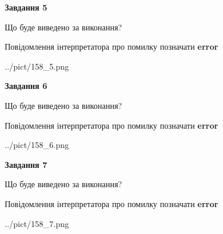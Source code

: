 \documentclass[10pt, ukrainian]{article}
\begin{document}
{\begin {large}
{\begin {center}\textbf{Завдання 5}\end {center}}\par
Що буде виведено за виконання? \par
Повідомлення інтерпретатора про помилку позначати \textbf{error}

\begin{center}
	{../pict/158_5.png}
\end{center}
\newpage

{\begin {center}\textbf{Завдання 6}\end {center}}\par
Що буде виведено за виконання? \par
Повідомлення інтерпретатора про помилку позначати \textbf{error}

\begin{center}
	{../pict/158_6.png}
\end{center}
\newpage

{\begin {center}\textbf{Завдання 7}\end {center}}\par
Що буде виведено за виконання? \par
Повідомлення інтерпретатора про помилку позначати \textbf{error}

\begin{center}
	{../pict/158_7.png}
\end{center}
\newpage

\end {large}}
\end{document}
